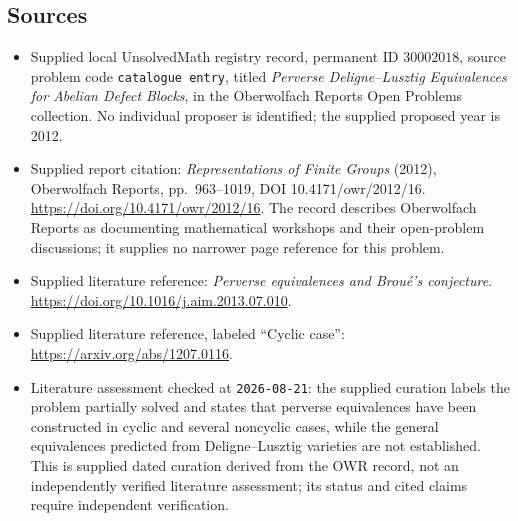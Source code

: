 \documentclass[11pt]{article}
\begin{document}
\subsection{Sources}
\begin{itemize}
\item Supplied local UnsolvedMath registry record, permanent ID \(30002018\), source problem code \texttt{catalogue entry}, titled \emph{Perverse Deligne--Lusztig Equivalences for Abelian Defect Blocks}, in the Oberwolfach Reports Open Problems collection. No individual proposer is identified; the supplied proposed year is 2012.
\item Supplied report citation: \emph{Representations of Finite Groups} (2012), Oberwolfach Reports, pp.~963--1019, DOI 10.4171/owr/2012/16. \url{https://doi.org/10.4171/owr/2012/16}. The record describes Oberwolfach Reports as documenting mathematical workshops and their open-problem discussions; it supplies no narrower page reference for this problem.
\item Supplied literature reference: \emph{Perverse equivalences and Brou\'e's conjecture}. \url{https://doi.org/10.1016/j.aim.2013.07.010}.
\item Supplied literature reference, labeled ``Cyclic case'': \url{https://arxiv.org/abs/1207.0116}.
\item Literature assessment checked at \texttt{2026-08-21}: the supplied curation labels the problem partially solved and states that perverse equivalences have been constructed in cyclic and several noncyclic cases, while the general equivalences predicted from Deligne--Lusztig varieties are not established. This is supplied dated curation derived from the OWR record, not an independently verified literature assessment; its status and cited claims require independent verification.
\end{itemize}
\end{document}
